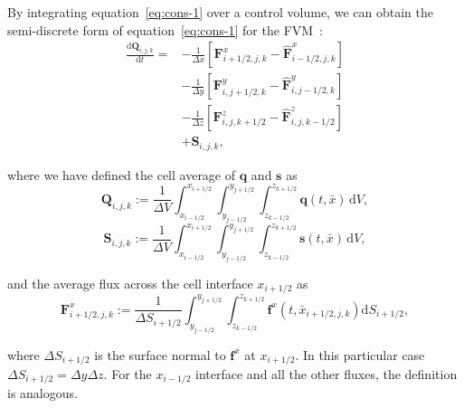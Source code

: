 By integrating equation~\eqref{eq:cons-1} over a control volume, we can obtain the semi-discrete form of equation~\eqref{eq:cons-1} for the FVM~\citep[cf.][]{leveque2002,toro2009}:
\begin{equation}
\begin{split}
    \frac{\mathrm{d} \mathbf{Q}_{i,j,k}}{\mathrm{d}t} = &- \frac{1}{\Delta x} \left[
    \mathbf{{F}}^x_{i+1/2,j,k} - \mathbf{\hat{F}}^x_{i-1/2,j,k}
    \right]\\
    &- \frac{1}{\Delta y} \left[
    \mathbf{{F}}^y_{i,j+1/2,k} - \mathbf{\hat{F}}^y_{i,j-1/2,k}
    \right]\\ 
    &- \frac{1}{\Delta z} \left[
    \mathbf{{F}}^z_{i,j,k+1/2} - \mathbf{\hat{F}}^z_{i,j,k-1/2}
    \right]\\
    & + \mathbf{S}_{i,j,k},
\end{split}
\label{eq:disc}
\end{equation}

\noindent where we have defined the cell average of $\mathbf{q}$ and $\mathbf{s}$ as
\begin{equation}
    \mathbf{Q}_{i,j,k} := \frac{1}{\Delta V} \int_{x_{i - 1/2}}^{x_{i + 1/2}} \int_{y_{j - 1/2}}^{y_{j + 1/2}}
    \int_{z_{k - 1/2}}^{z_{k + 1/2}} \mathbf{q} (t,\bar{x}) \, \mathrm{d}V,
\end{equation}
\begin{equation}
    \mathbf{S}_{i,j,k} := \frac{1}{\Delta V} \int_{x_{i - 1/2}}^{x_{i + 1/2}} \int_{y_{j - 1/2}}^{y_{j + 1/2}}
    \int_{z_{k - 1/2}}^{z_{k + 1/2}} \mathbf{s} (t,\bar{x}) \, \mathrm{d}V,
\end{equation}

\noindent and the average flux across the cell interface $x_{i + 1/2}$  as
\begin{equation}
    \mathbf{F}_{i+1/2,j,k}^x := \frac{1}{\Delta S_{i+1/2}} \int_{y_{j - 1/2}}^{y_{j + 1/2}} \int_{z_{k - 1/2}}^{z_{k + 1/2}} \mathbf{f}^x(t,\bar{x}_{i+1/2,j,k}) \mathrm{d} S_{i+1/2},
\end{equation}

\noindent where $\Delta S_{i+1/2}$ is the surface normal to $\mathbf{f}^x$ at $x_{i + 1/2 }$. In this particular case $\Delta S_{i+1/2} = \Delta y \Delta z$. For the $x_{i-1/2}$ interface and all the other fluxes, the definition is analogous. 


